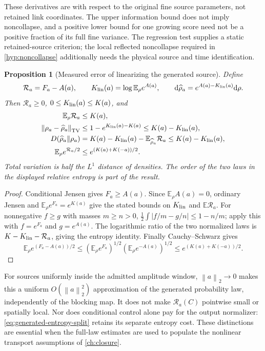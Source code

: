 \documentclass[11pt,oneside,openany]{book}
\newtheorem{proposition}[proposition]{Proposition}
\theoremstyle{definition}
\theoremstyle{remark}
\newcommand{\E}{\mathbb E}
\newcommand{\dd}{\mathrm d}
\newcommand{\norm}[1]{\left\lVert#1\right\rVert}
\newcommand{\src}[2]{\cite[#2]{#1}}
\begin{document}
These derivatives are with respect to the original fine source
parameters, not retained link coordinates. The upper information bound
does not imply noncollapse, and a positive lower bound for one growing
score need not be a positive fraction of its full fine variance. The
regression test supplies a static retained-source criterion; the local
reflected noncollapse required in \cref{hyp:noncollapse} additionally
needs the physical source and time identification.

\begin{proposition}[Measured error of linearizing the generated source]
\label{prop:generated-source-linearization}
Define
\[
 \mathcal R_a=F_a-A(a),\qquad
 K_{\rm lin}(a)=\log\E_\rho e^{A(a)},\qquad
 \dd\widehat\rho_a=e^{A(a)-K_{\rm lin}(a)}\dd\rho.
\]
Then $\mathcal R_a\ge0$, $0\le K_{\rm lin}(a)\le K(a)$, and
\begin{align}
 \E_\rho\mathcal R_a&\le K(a),\notag\\
 \norm{\rho_a-\widehat\rho_a}_{\rm TV}
   &\le1-e^{K_{\rm lin}(a)-K(a)}
                     \le K(a)-K_{\rm lin}(a),\notag\\
 D(\widehat\rho_a\Vert\rho_a)
   &=K(a)-K_{\rm lin}(a)-\E_{\widehat\rho_a}\mathcal R_a
                     \le K(a)-K_{\rm lin}(a),\notag\\
 \E_\rho e^{\mathcal R_a/2}
   &\le e^{(K(a)+K(-a))/2}.
 \label{eq:generated-source-linearization}
\end{align}
Total variation is half the $L^1$ distance of densities. The order of
the two laws in the displayed relative entropy is part of the result.
\end{proposition}
\begin{proof}
Conditional Jensen gives $F_a\ge A(a)$. Since $\E_\rho A(a)=0$,
ordinary Jensen and $\E_\rho e^{F_a}=e^{K(a)}$ give the stated bounds
on $K_{\rm lin}$ and $\E\mathcal R_a$. For nonnegative $f\ge g$
with masses $m\ge n>0$,
$\tfrac12\int|f/m-g/n|\le1-n/m$; apply this with
$f=e^{F_a}$ and $g=e^{A(a)}$. The logarithmic ratio of the two
normalized laws is $K-K_{\rm lin}-\mathcal R_a$, giving the entropy
identity. Finally Cauchy--Schwarz gives
\[
 \E_\rho e^{(F_a-A(a))/2}
 \le(\E_\rho e^{F_a})^{1/2}(\E_\rho e^{-A(a)})^{1/2}
 \le e^{(K(a)+K(-a))/2}.
\]
\src{F15}{V2}
\end{proof}

For sources uniformly inside the admitted amplitude window,
$\norm a_2\to0$ makes this a uniform $O(\norm a_2^2)$ approximation
of the generated probability law, independently of the blocking map.
It does not make $\mathcal R_a(C)$ pointwise small or spatially local.
Nor does conditional control alone pay for the output normalizer:
\cref{eq:generated-entropy-split} retains its separate entropy cost.
These distinctions are essential when the full-law estimates are used
to populate the nonlinear transport assumptions of \cref{ch:closure}.
\end{document}
